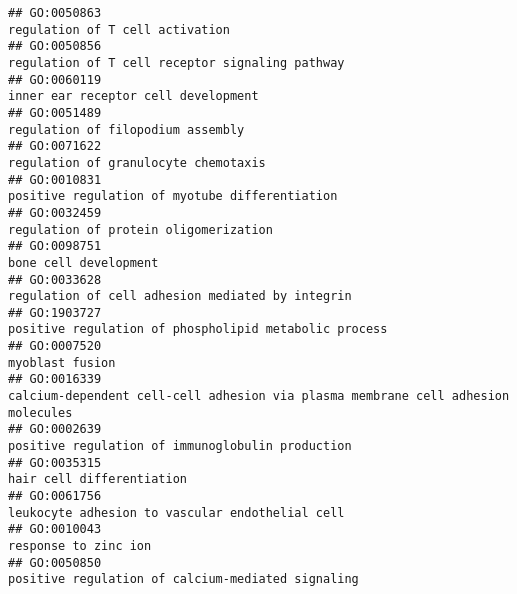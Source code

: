 \documentclass[
]{article}
\begin{document}
\begin{verbatim}
## GO:0050863                                                                                                                  regulation of T cell activation
## GO:0050856                                                                                                  regulation of T cell receptor signaling pathway
## GO:0060119                                                                                                              inner ear receptor cell development
## GO:0051489                                                                                                                regulation of filopodium assembly
## GO:0071622                                                                                                             regulation of granulocyte chemotaxis
## GO:0010831                                                                                                   positive regulation of myotube differentiation
## GO:0032459                                                                                                            regulation of protein oligomerization
## GO:0098751                                                                                                                            bone cell development
## GO:0033628                                                                                                 regulation of cell adhesion mediated by integrin
## GO:1903727                                                                                            positive regulation of phospholipid metabolic process
## GO:0007520                                                                                                                                  myoblast fusion
## GO:0016339                                                                 calcium-dependent cell-cell adhesion via plasma membrane cell adhesion molecules
## GO:0002639                                                                                                 positive regulation of immunoglobulin production
## GO:0035315                                                                                                                        hair cell differentiation
## GO:0061756                                                                                                  leukocyte adhesion to vascular endothelial cell
## GO:0010043                                                                                                                             response to zinc ion
## GO:0050850                                                                                                positive regulation of calcium-mediated signaling

\end{verbatim}
\end{document}
